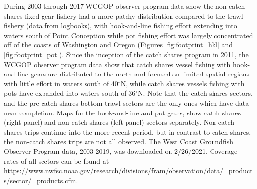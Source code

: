 \documentclass[11pt,
  english,
  a4paper,
]{article}
\begin{document}
During 2003 through 2017 WCGOP observer program data show the non-catch shares fixed-gear fishery had a more patchy distribution compared to the trawl fishery (data from logbooks), with hook-and-line fishing effort extending into waters south of Point Conception while pot fishing effort was largely concentrated off of the coasts of Washington and Oregon (Figures \ref{fig:footprint_hkl} and \ref{fig:footprint_pot}). Since the inception of the catch shares program in 2011, the WCGOP observer program data show that catch shares vessel fishing with hook-and-line gears are distributed to the north and focused on limited spatial regions with little effort in waters south of 40{\(^{\circ}\)\leavevmode\tagmcend\tagstructend}N, while catch shares vessels fishing with pots have expanded into waters south of 36{\(^{\circ}\)\leavevmode\tagmcend\tagstructend}N. Note that the catch shares sectors, and the pre-catch shares bottom trawl sectors are the only ones which have data near completion. Maps for the hook-and-line and pot gears, show catch shares (right panel) and non-catch shares (left panel) sectors separately. Non-catch shares trips continue into the more recent period, but in contrast to catch shares, the non-catch shares trips are not all observed. The West Coast Groundfish Observer Program data, 2003-2019, was downloaded on 2/26/2021. Coverage rates of all sectors can be found at {\url{https://www.nwfsc.noaa.gov/research/divisions/fram/observation/data/_products/sector/_products.cfm}\leavevmode\tagmcend\tagstructend}.

\end{document}
